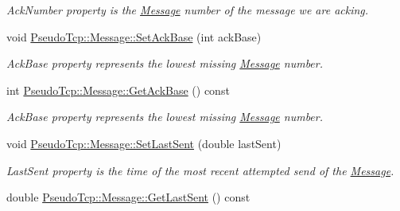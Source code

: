 \begin{DoxyCompactItemize}
\begin{DoxyCompactList}\small\item\em AckNumber property is the \hyperlink{classPseudoTcp_1_1Message}{Message} number of the message we are acking. \item\end{DoxyCompactList}\item 
\hypertarget{group__group1_ga21fdfd49d1112874b860a10094f7dbe4}{
void \hyperlink{group__group1_ga21fdfd49d1112874b860a10094f7dbe4}{PseudoTcp::Message::SetAckBase} (int ackBase)}
\label{group__group1_ga21fdfd49d1112874b860a10094f7dbe4}

\begin{DoxyCompactList}\small\item\em AckBase property represents the lowest missing \hyperlink{classPseudoTcp_1_1Message}{Message} number. \item\end{DoxyCompactList}\item 
\hypertarget{group__group1_ga18f1c004034b89226d9c29a16425e18f}{
int \hyperlink{group__group1_ga18f1c004034b89226d9c29a16425e18f}{PseudoTcp::Message::GetAckBase} () const }
\label{group__group1_ga18f1c004034b89226d9c29a16425e18f}

\begin{DoxyCompactList}\small\item\em AckBase property represents the lowest missing \hyperlink{classPseudoTcp_1_1Message}{Message} number. \item\end{DoxyCompactList}\item 
void \hyperlink{group__group1_ga8d775b77bb73f7db77e0f8fec82b9a26}{PseudoTcp::Message::SetLastSent} (double lastSent)
\begin{DoxyCompactList}\small\item\em LastSent property is the time of the most recent attempted send of the \hyperlink{classPseudoTcp_1_1Message}{Message}. \item\end{DoxyCompactList}\item 
\hypertarget{group__group1_ga342f652745ccf8d643991905c3c4ac0a}{
double \hyperlink{group__group1_ga342f652745ccf8d643991905c3c4ac0a}{PseudoTcp::Message::GetLastSent} () const }
\label{group__group1_ga342f652745ccf8d643991905c3c4ac0a}


\end{DoxyCompactItemize}
